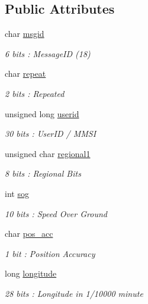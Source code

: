\subsection*{Public Attributes}
\begin{DoxyCompactItemize}
\item 
char \mbox{\hyperlink{structaismsg__18_a38d398e7f24d42179be653fc151479e5}{msgid}}
\begin{DoxyCompactList}\small\item\em 6 bits \+: Message\+ID (18) \end{DoxyCompactList}\item 
char \mbox{\hyperlink{structaismsg__18_aac7b1ec5baead1daa41100de74e1f5a2}{repeat}}
\begin{DoxyCompactList}\small\item\em 2 bits \+: Repeated \end{DoxyCompactList}\item 
unsigned long \mbox{\hyperlink{structaismsg__18_ab335d571702a0d31b3503e6e2ea32915}{userid}}
\begin{DoxyCompactList}\small\item\em 30 bits \+: User\+ID / M\+M\+SI \end{DoxyCompactList}\item 
unsigned char \mbox{\hyperlink{structaismsg__18_a2a66b68670159a6168a4f126ec913c65}{regional1}}
\begin{DoxyCompactList}\small\item\em 8 bits \+: Regional Bits \end{DoxyCompactList}\item 
int \mbox{\hyperlink{structaismsg__18_a659abb523d3245ecf2d6620d96e38413}{sog}}
\begin{DoxyCompactList}\small\item\em 10 bits \+: Speed Over Ground \end{DoxyCompactList}\item 
char \mbox{\hyperlink{structaismsg__18_a0bc074881c9ed3929c5d72ed09d15170}{pos\+\_\+acc}}
\begin{DoxyCompactList}\small\item\em 1 bit \+: Position Accuracy \end{DoxyCompactList}\item 
long \mbox{\hyperlink{structaismsg__18_a971102ab19428aef340b1cf5de7ed940}{longitude}}
\begin{DoxyCompactList}\small\item\em 28 bits \+: Longitude in 1/10000 minute \end{DoxyCompactList}\item 

\end{DoxyCompactItemize}
